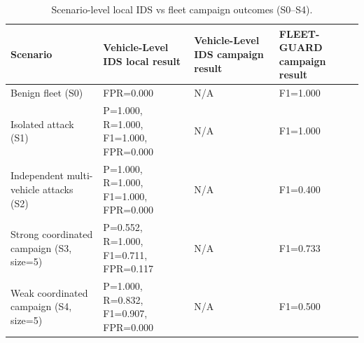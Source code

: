 \begin{table}[t]
\centering
\caption{Scenario-level local IDS vs fleet campaign outcomes (S0--S4).}
\label{tab:scenario_level_comparison}
\begin{tabular}{llll}
\toprule
Scenario & Vehicle-Level IDS local result & Vehicle-Level IDS campaign result & FLEET-GUARD campaign result \\
\midrule
Benign fleet (S0) & FPR=0.000 & N/A & F1=1.000 \\
Isolated attack (S1) & P=1.000, R=1.000, F1=1.000, FPR=0.000 & N/A & F1=1.000 \\
Independent multi-vehicle attacks (S2) & P=1.000, R=1.000, F1=1.000, FPR=0.000 & N/A & F1=0.400 \\
Strong coordinated campaign (S3, size=5) & P=0.552, R=1.000, F1=0.711, FPR=0.117 & N/A & F1=0.733 \\
Weak coordinated campaign (S4, size=5) & P=1.000, R=0.832, F1=0.907, FPR=0.000 & N/A & F1=0.500 \\
\bottomrule
\end{tabular}

\end{table}
